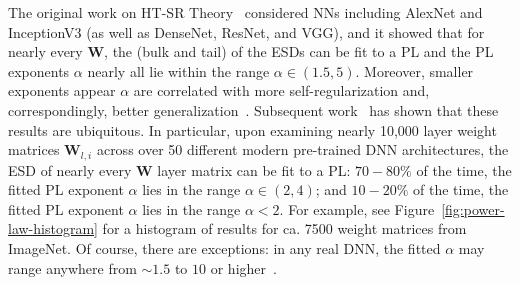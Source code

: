 The original work on HT-SR Theory~\cite{MM18_TR} considered NNs including AlexNet and InceptionV3 (as well as DenseNet, ResNet, and VGG), and it showed that for nearly every $\mathbf{W}$, the (bulk and tail) of the ESDs can be fit to a PL and the PL exponents $\alpha$ nearly all lie within the range $\alpha\in(1.5,5)$.
Moreover, smaller exponents appear $\alpha$ are correlated with more self-regularization and, correspondingly, better generalization~\cite{MM18_TR}.
Subsequent work~\cite{MM18_unpub_work} has shown that these results are ubiquitous. 
In particular, upon examining nearly 10,000 layer weight matrices $\mathbf{W}_{l,i}$ across over 50 different modern pre-trained DNN architectures, the ESD of nearly every $\mathbf{W}$ layer matrix can be fit to a PL:
$70-80\%$ of the time, the fitted PL exponent $\alpha$ lies in the range $\alpha\in(2,4)$; and  %
$10-20\%$ of the time, the fitted PL exponent $\alpha$ lies in the range $\alpha< 2$.  %
For example, see Figure~\ref{fig:power-law-histogram} for a histogram of results for ca. 7500 weight matrices from ImageNet.
Of course, there are exceptions: in any real DNN, the fitted $\alpha$ may range anywhere from $\sim 1.5$ to $10$ or higher~\cite{MM18_unpub_work}.  

